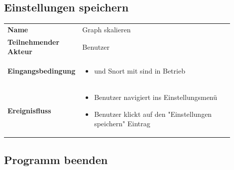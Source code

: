 \subsection{Einstellungen speichern}

\begin{tabular}{lp{0.9\linewidth}}
\textbf{Name} & Graph skalieren \\

\textbf{Teilnehmender Akteur} & Benutzer \\

\textbf{Eingangsbedingung} &
				\begin{minipage}[t]{\linewidth}
				\begin{itemize}[nosep,after=\strut,leftmargin=10pt]
				
				\item \programname und Snort mit \sppname sind in Betrieb

				\end{itemize}
				\end{minipage} \\
\textbf{Ereignisfluss} &
				\begin{minipage}[t]{\linewidth}
				\begin{itemize}[nosep,after=\strut,leftmargin=10pt]
				\item Benutzer navigiert ins Einstellungsmenü
				\item Benutzer klickt auf den "Einstellungen speichern" Eintrag
				\end{itemize}
				\end{minipage} \\
\end{tabular}

\subsection{Programm beenden}

